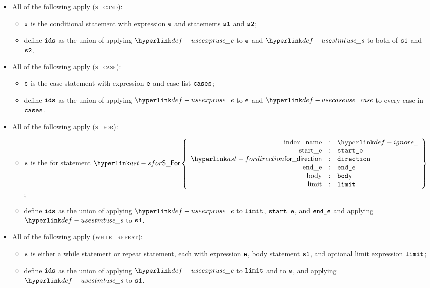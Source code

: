 \begin{itemize}
  \item All of the following apply (\textsc{s\_cond}):
  \begin{itemize}
    \item $\texttt{s}$ is the conditional statement with expression $\texttt{e}$ and statements $\texttt{s1}$ and $\texttt{s2}$;
    \item define $\texttt{ids}$ as the union of applying $\useexpr$ to $\texttt{e}$ and $\usestmt$ to both of $\texttt{s1}$ and $\texttt{s2}$.
  \end{itemize}

  \item All of the following apply (\textsc{s\_case}):
  \begin{itemize}
    \item $\texttt{s}$ is the case statement with expression $\texttt{e}$ and case list $\texttt{cases}$;
    \item define $\texttt{ids}$ as the union of applying $\useexpr$ to $\texttt{e}$ and $\usecase$ to every case in $\texttt{cases}$.
  \end{itemize}

  \item All of the following apply (\textsc{s\_for}):
  \begin{itemize}
    \item $\texttt{s}$ is the for statement $\SFor\left\{\begin{array}{rcl}
      \Forindexname &:& \Ignore\\
      \Forstarte &:& \vstarte\\
      \fordirection &:& \vdirection\\
      \Forende &:& \vende\\
      \Forbody &:& \vbody\\
      \Forlimit &:& \vlimit
    \end{array}\right\}$;
    \item define $\texttt{ids}$ as the union of applying $\useexpr$ to $\texttt{limit}$, $\texttt{start\_e}$, and $\texttt{end\_e}$ and applying $\usestmt$ to $\texttt{s1}$.
  \end{itemize}

  \item All of the following apply (\textsc{while\_repeat}):
  \begin{itemize}
    \item $\texttt{s}$ is either a while statement or repeat statement, each with expression $\texttt{e}$, body statement $\texttt{s1}$,
          and optional limit expression $\texttt{limit}$;
    \item define $\texttt{ids}$ as the union of applying $\useexpr$ to $\texttt{limit}$ and to $\texttt{e}$, and applying $\usestmt$ to $\texttt{s1}$.
  \end{itemize}


\end{itemize}
